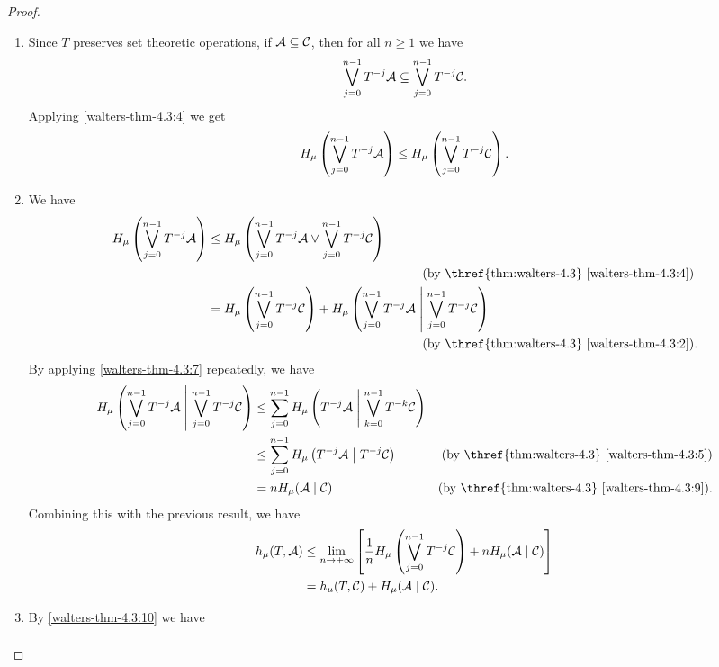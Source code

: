 \begin{theorem}
\begin{proof}
\begin{enumerate}
			\item Since $T$ preserves set theoretic operations, if $\mathcal{A} \subseteq \mathcal{C}$, then for all $n \geq 1$ we have
				\[
					\bigvee_{j = 0}^{n - 1}{T^{-j}{\mathcal{A}}} \subseteq \bigvee_{j = 0}^{n - 1}{T^{-j}{\mathcal{C}}}.
				\]
				Applying  \ref{walters-thm-4.3:4} we get
				\[
					H_\mu\left(\bigvee_{j = 0}^{n - 1}{T^{-j}{\mathcal{A}}}\right) \leq H_\mu\left(\bigvee_{j = 0}^{n - 1}{T^{-j}{\mathcal{C}}}\right).
				\]
			\item We have
				\begin{align*}
					H_\mu\left(\bigjoin_{j = 0}^{n - 1}{T^{-j}{\A}}\right) &\leq H_\mu\left(\bigjoin_{j = 0}^{n - 1}{T^{-j}{\A}} \join \bigjoin_{j = 0}^{n - 1}{T^{-j}{\C}}\right) \\ & \hspace{60mm} \text{(by \thref{thm:walters-4.3} \ref{walters-thm-4.3:4})} \\
						&= H_\mu\left(\bigjoin_{j = 0}^{n - 1}{T^{-j}{\C}}\right) + H_\mu\left(\bigjoin_{j = 0}^{n - 1}{T^{-j}{\A}} \midmid \bigjoin_{j = 0}^{n - 1}{T^{-j}{\C}}\right) \\ & \hspace{60mm} \text{(by \thref{thm:walters-4.3} \ref{walters-thm-4.3:2}).}
				\end{align*}
				By applying  \ref{walters-thm-4.3:7} repeatedly, we have
				\begin{align*}
					H_\mu\left(\bigjoin_{j = 0}^{n - 1}{T^{-j}{\A}} \midmid \bigjoin_{j = 0}^{n - 1}{T^{-j}{\C}}\right) &\leq \sum_{j = 0}^{n - 1}{H_\mu\left(T^{-j}{\A} \midmid \bigjoin_{k = 0}^{n - 1}{T^{-k}{\C}}\right)} \\
						&\leq \sum_{j = 0}^{n - 1}{H_\mu\left(T^{-j}{\A} \midmid T^{-j}{\C}\right)} & \text{(by \thref{thm:walters-4.3} \ref{walters-thm-4.3:5})} \\
						&= nH_\mu(\A \mid \C) & \text{(by \thref{thm:walters-4.3} \ref{walters-thm-4.3:9}).}
				\end{align*}
				Combining this with the previous result, we have
				\begin{align*}
					h_\mu(T, \mathcal{A}) &\leq \lim_{n \to +\infty}{\left[\frac{1}{n} H_\mu\left(\bigvee_{j = 0}^{n - 1}{T^{-j}{\mathcal{C}}}\right) + nH_\mu(\mathcal{A} \mid \mathcal{C})\right]} \\
						&= h_\mu(T, \mathcal{C}) + H_\mu(\mathcal{A} \mid \mathcal{C}).
				\end{align*}
			\item By  \ref{walters-thm-4.3:10} we have
				\begin{align*}

\end{align*}
\end{enumerate}
\end{proof}
\end{theorem}

